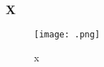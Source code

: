 
\begin{frame}
  \frametitle{X}
  \begin{figure}[h!]
    \centering
    \texttt{[image: .png]}
    \caption{x}
    \label{fig:x}
  \end{figure}
\end{frame}

